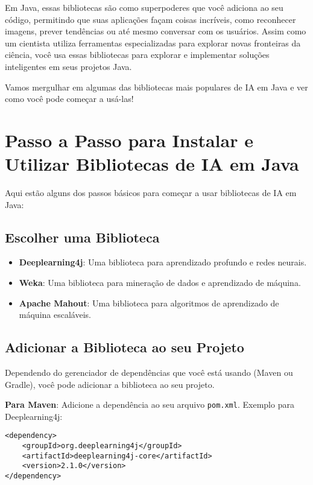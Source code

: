 \documentclass[a4paper,12pt]{book}
\begin{document}
Em Java, essas bibliotecas são como superpoderes que você adiciona ao seu código, permitindo que suas aplicações façam coisas incríveis, como reconhecer imagens, prever tendências ou até mesmo conversar com os usuários. Assim como um cientista utiliza ferramentas especializadas para explorar novas fronteiras da ciência, você usa essas bibliotecas para explorar e implementar soluções inteligentes em seus projetos Java.

Vamos mergulhar em algumas das bibliotecas mais populares de IA em Java e ver como você pode começar a usá-las!

\section{Passo a Passo para Instalar e Utilizar Bibliotecas de IA em Java}

Aqui estão alguns dos passos básicos para começar a usar bibliotecas de IA em Java:

\subsection{Escolher uma Biblioteca}

\begin{itemize}
    \item \textbf{Deeplearning4j}: Uma biblioteca para aprendizado profundo e redes neurais.
    \item \textbf{Weka}: Uma biblioteca para mineração de dados e aprendizado de máquina.
    \item \textbf{Apache Mahout}: Uma biblioteca para algoritmos de aprendizado de máquina escaláveis.
\end{itemize}

\subsection{Adicionar a Biblioteca ao seu Projeto}

Dependendo do gerenciador de dependências que você está usando (Maven ou Gradle), você pode adicionar a biblioteca ao seu projeto.

\textbf{Para Maven}:
Adicione a dependência ao seu arquivo \texttt{pom.xml}. Exemplo para Deeplearning4j:

\begin{verbatim}
<dependency>
    <groupId>org.deeplearning4j</groupId>
    <artifactId>deeplearning4j-core</artifactId>
    <version>2.1.0</version>
</dependency>
\end{verbatim}
\end{document}
